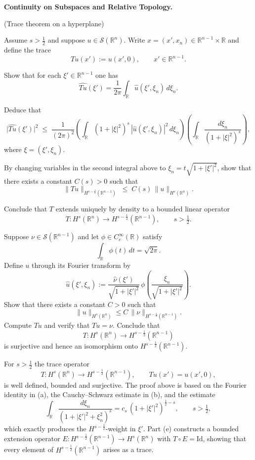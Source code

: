 \begin{problem}[CP-II-0455]
\label{prob:cp-ii-0455}
\textbf{Continuity on Subspaces and Relative Topology.}

\hspace*{1.5em}(Trace theorem on a hyperplane)

Assume $s>\tfrac12$ and suppose $u\in\mathcal S(\mathbb R^n)$.
Write $x=(x',x_n)\in\mathbb R^{n-1}\times\mathbb R$ and define the trace
\[
Tu(x') := u(x',0),\qquad x'\in\mathbb R^{n-1}.
\]

Show that for each $\xi'\in\mathbb R^{n-1}$ one has
\[
\widehat{Tu}(\xi') = \frac{1}{2\pi}\int_{\mathbb R}\widehat u(\xi',\xi_n)\,d\xi_n.
\]

Deduce that
\[
\bigl|\widehat{Tu}(\xi')\bigr|^2
\;\le\;
\frac{1}{(2\pi)^2}
\left(\int_{\mathbb R} (1+|\xi|^2)^s\,|\widehat u(\xi',\xi_n)|^2\,d\xi_n\right)
\left(\int_{\mathbb R}\frac{d\xi_n}{(1+|\xi|^2)^s}\right),
\]
where $\xi=(\xi',\xi_n)$.

By changing variables in the second integral above to
$\xi_n = t\sqrt{1+|\xi'|^2}$, show that there exists a constant $C(s)>0$
such that
\[
\|Tu\|_{H^{s-\frac12}(\mathbb R^{n-1})}
\;\le\; C(s)\,\|u\|_{H^s(\mathbb R^n)}.
\]

Conclude that $T$ extends uniquely by density to a bounded linear operator
\[
T:H^s(\mathbb R^n)\longrightarrow H^{s-\frac12}(\mathbb R^{n-1}),
\qquad s>\tfrac12.
\]

Suppose $\nu\in\mathcal S(\mathbb R^{n-1})$ and let $\phi\in C_c^\infty(\mathbb R)$ satisfy
\[
\int_{\mathbb R}\phi(t)\,dt = \sqrt{2\pi}.
\]
Define $u$ through its Fourier transform by
\[
\widehat u(\xi',\xi_n)
:= \frac{\widehat\nu(\xi')}{\sqrt{1+|\xi'|^2}}\,
\phi\!\left(\frac{\xi_n}{\sqrt{1+|\xi'|^2}}\right).
\]
Show that there exists a constant $C>0$ such that
\[
\|u\|_{H^s(\mathbb R^n)} \le C\,\|\nu\|_{H^{s-\frac12}(\mathbb R^{n-1})}.
\]
Compute $Tu$ and verify that $Tu=\nu$. Conclude that
\[
T:H^s(\mathbb R^n)\longrightarrow H^{s-\frac12}(\mathbb R^{n-1})
\]
is surjective and hence an isomorphism onto $H^{s-\frac12}(\mathbb R^{n-1})$.

\bigskip

For $s>\tfrac12$ the trace operator
\[
T:H^s(\mathbb R^n)\to H^{s-\frac12}(\mathbb R^{n-1}),
\qquad Tu(x')=u(x',0),
\]
is well defined, bounded and surjective. The proof above is based on the
Fourier identity in (a), the Cauchy--Schwarz estimate in (b),
and the estimate
\[
\int_{\mathbb R}\frac{d\xi_n}{(1+|\xi'|^2+\xi_n^2)^s}
= c_s\,(1+|\xi'|^2)^{\frac12-s},\qquad s>\tfrac12,
\]
which exactly produces the $H^{s-\frac12}$-weight in $\xi'$.
Part (e) constructs a bounded extension operator
$E:H^{s-\frac12}(\mathbb R^{n-1})\to H^s(\mathbb R^n)$ with $T\circ E=\mathrm{Id}$,
showing that every element of $H^{s-\frac12}(\mathbb R^{n-1})$ arises as a trace.
\end{problem}

